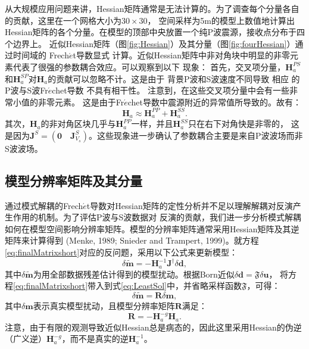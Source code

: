 从大规模应用问题来讲，Hessian矩阵通常是无法计算的。为了调查每个分量各自的贡献，这里在一个网格大小为$30\times30$，
空间采样为5m的模型上数值地计算出Hessian矩阵的各个分量。在模型的顶部中央放置一个纯P波震源，接收点分布于四个边界上。
近似Hessian矩阵（图\ref{fig:Hessian}）及其分量（图\ref{fig:fourHessian}）通过时间域的
Frech{$\acute{e}$}t导数显式
计算。近似Hessian矩阵中非对角块中明显的非零元素代表了很强的参数耦合效应。可以观察到以下
现象：
首先，交叉项分量，$\mathbf{H}_a^{PS}$和$\mathbf{H}_a^{SP}$对$\mathbf{H}_a$的贡献可以忽略不计。这是由于
背景P波和S波速度不同导致
相应
的P波与S波Fr{$\acute{e}$}chet导数
不具有相干性。
注意到，在这些交叉项分量中会有一些非常小值的非零元素。
这是由于Fr{$\acute{e}$}chet导数中震源附近的异常值所导致的。故有：
\begin{equation}
        \mathbf{H}_a\approx
        \mathbf{H}_a^{PP}+
        \mathbf{H}_a^{SS}.
        \label{eq:C3}
\end{equation}
其次，$\mathbf{H}_a$的非对角区块几乎与$\mathbf{H}_a^{PP}$一样，并且$\mathbf{H}_a^{SS}$只在右下对角快是非零的，
这是因为$\mathbf{J}^S=(\mathbf{0}\quad\mathbf{J}^S_{V_s})$。这些现象进一步确认了参数耦合主要是来自P波波场而非S波波场。
\subsection{模型分辨率矩阵及其分量}
通过模式解耦的Frech{$\acute{e}$}t导数对Hessian矩阵的定性分析并不足以理解解耦对反演产生作用的机制。为了评估P波与S波数据对
反演的贡献，我们进一步分析模式解耦如何在模型空间影响分辨率矩阵。模型的分辨率矩阵通常采用Hessian矩阵及其逆矩阵来计算得到
(Menke, 1989\cite[]{menke:1989}; Snieder and Trampert, 1999\cite{snieder1999inverse})。就方程\eqref{eq:finalMatrixshort}对应的反问题，采用以下公式来更新模型：
\begin{equation}
	\delta \tilde{\mathbf{m}}=-\mathbf{H}^{-1}_a\mathbf{J}^{\dagger}\delta 
        \mathbf{d},
        \label{eq:LeastSol}
\end{equation}
其中$\delta\tilde{\mathbf{m}}$为用全部数据残差估计得到的模型扰动。根据Born近似$\delta\mathbf{d}=\mathfrak{F}{\delta\mathbf{u}}$，
将方程\eqref{eq:finalMatrixshort}带入到式\eqref{eq:LeastSol}中，并省略采样函数$\mathfrak{F}$，可得：
\begin{equation}
	\delta \tilde{\mathbf{m}}=\mathbf{R}\delta \mathbf{m},
	\label{eq:ResoMatr}
\end{equation}
其中$\delta \mathbf{m}$表示真实模型扰动，且模型分辨率矩阵$\mathbf{R}$满足：
\begin{equation}
        \mathbf{R}=-\mathbf{H}^{-g}_a\mathbf{H}_a. 
        \label{eq:ResoOper} 
\end{equation}
注意，由于有限的观测导致近似Hessian总是病态的，因此这里采用Hessian的伪逆（广义逆）$\mathbf{H}^{-g}_a$，而不是真实的逆$\mathbf{H}^{-1}_a$。

